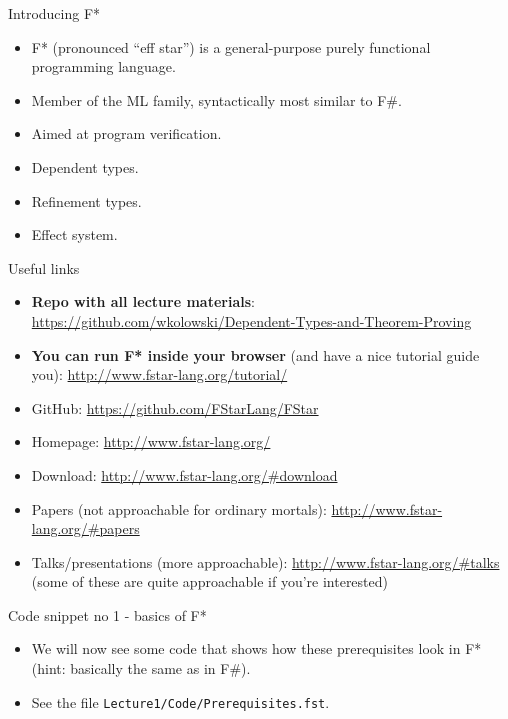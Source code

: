 \documentclass{beamer}
\begin{document}
\begin{frame}{Introducing F*}
\begin{itemize}
	\item F* (pronounced ``eff star'') is a general-purpose purely functional programming language.
	\item Member of the ML family, syntactically most similar to F\#.
	\item Aimed at program verification.
	\item Dependent types.
	\item Refinement types.
	\item Effect system.
\end{itemize}
\end{frame}

\begin{frame}{Useful links}
\begin{itemize}
	\item \textbf{Repo with all lecture materials}: \url{https://github.com/wkolowski/Dependent-Types-and-Theorem-Proving}
	\item \textbf{You can run F* inside your browser} (and have a nice tutorial guide you): \url{http://www.fstar-lang.org/tutorial/}
	\item GitHub: \url{https://github.com/FStarLang/FStar}
	\item Homepage: \url{http://www.fstar-lang.org/}
	\item Download: \url{http://www.fstar-lang.org/\#download}
	\item Papers (not approachable for ordinary mortals): \url{http://www.fstar-lang.org/\#papers}
	\item Talks/presentations (more approachable): \url{http://www.fstar-lang.org/\#talks} (some of these are quite approachable if you're interested)  
\end{itemize}
\end{frame}

\begin{frame}{Code snippet no 1 - basics of F*}
\begin{itemize}
	\item We will now see some code that shows how these prerequisites look in F* (hint: basically the same as in F\#).
	\item See the file \texttt{Lecture1/Code/Prerequisites.fst}.
\end{itemize}
\end{frame}
\end{document}
